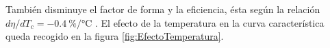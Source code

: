 También disminuye el factor de forma y la eficiencia, ésta según la
relación $d\eta/dT_{c}=\SI{-0.4}{\percent\per\celsius}$
.
El efecto de la temperatura en la curva característica queda recogido
en la figura \ref{fig:EfectoTemperatura}.


%
\begin{figure}
\begin{centering}
\par\end{centering}

\begin{centering}
\end{centering}
\end{figure}
